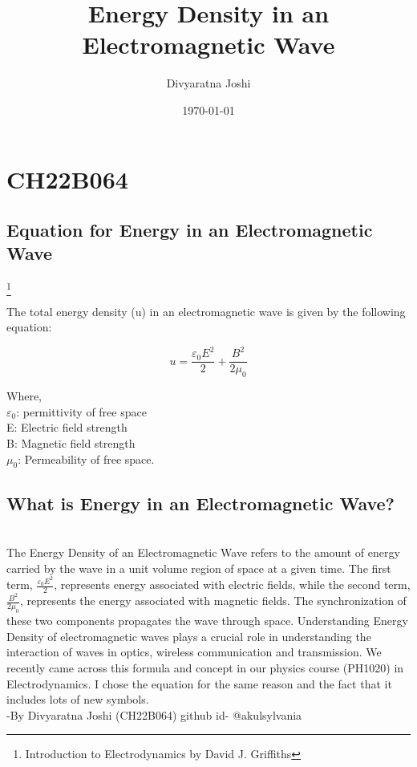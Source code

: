 \documentclass{article}
\begin{document}
\title{Energy Density in an Electromagnetic Wave}
\author{Divyaratna Joshi}
\date{\today}

\maketitle

\section{CH22B064}
\subsection{Equation for Energy in an Electromagnetic Wave}
\footnote{Introduction to Electrodynamics by David J. Griffiths}

The total energy density (u) in an electromagnetic wave is given by the following equation:

\[
u = \frac{{\varepsilon_0 E^2}}{2} + \frac{{B^2}}{2\mu_0}
\]

Where,
\\ $\varepsilon_0$: permittivity of free space
\\ E: Electric field strength
\\ B: Magnetic field strength
\\ $\mu_0$: Permeability of free space.

\subsection{What is Energy in an Electromagnetic Wave?}

\\ The Energy Density of an Electromagnetic Wave refers to the amount of energy carried by the wave in a unit volume region of space at a given time. The first term, $\frac{{\varepsilon_0 E^2}}{2}$, represents energy associated with electric fields, while the second term, $\frac{{B^2}}{2\mu_0}$, represents the energy associated with magnetic fields. The synchronization of these two components propagates the wave through space. Understanding Energy Density of electromagnetic waves plays a crucial role in understanding the interaction of waves in optics, wireless communication and transmission. We recently came across this formula and concept in our physics course (PH1020) in Electrodynamics. I chose the equation for the same reason and the fact that it includes lots of new symbols. 
\\ -By Divyaratna Joshi (CH22B064) github id- @akulsylvania
\end{document}
